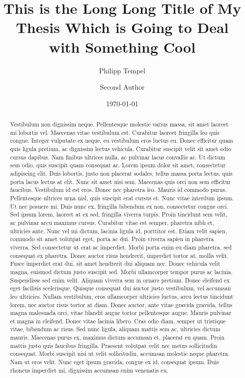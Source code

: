 \documentclass[%
  german,%
  exercise,%
  oneside,%
]{iswartcl}
\title{This is the Long Long Title of My Thesis Which is Going to Deal with Something Cool}
\author{Philipp Tempel \and Second Author}
\date{\today}
\begin{document}
\frontmatter

\maketitle


\begin{abstract}
  Vestibulum non dignissim neque. Pellentesque molestie varius massa, sit amet laoreet mi lobortis vel. Maecenas vitae vestibulum est. Curabitur laoreet fringilla leo quis congue. Integer vulputate ex neque, eu vestibulum eros luctus eu. Donec efficitur quam quis ligula pretium, ac dignissim lectus vehicula. Curabitur suscipit velit sit amet odio cursus dapibus. Nam finibus ultrices nulla, ac pulvinar lacus convallis ac. Ut dictum sem odio, quis suscipit quam consequat ac. Lorem ipsum dolor sit amet, consectetur adipiscing elit.
  Duis lobortis, justo non placerat sodales, tellus massa porta lectus, quis porta lacus lectus at elit. Nunc sit amet nisi sem. Maecenas quis orci non sem efficitur faucibus. Vestibulum id est eros. Donec nec pharetra leo. Mauris id commodo purus. Pellentesque ultrices urna nisl, quis suscipit erat cursus et. Nunc vitae interdum ipsum. Ut nec posuere mi. Duis nunc ex, fringilla bibendum ex non, consectetur congue orci. Sed ipsum lorem, laoreet at ex sed, fringilla viverra turpis. Proin tincidunt sem velit, ac pulvinar arcu maximus cursus. Curabitur vitae est semper, pharetra nibh et, ultricies ante.
  Nunc vel mi dictum, lacinia ligula id, porttitor est. Etiam velit sapien, commodo sit amet volutpat eget, porta ac dui. Proin viverra sapien in pharetra viverra. Sed consectetur ut erat ac imperdiet. Morbi porta enim eu diam pharetra, sed consequat ex pharetra. Donec auctor risus hendrerit, imperdiet tortor at, mollis velit. Fusce imperdiet erat dui, sit amet hendrerit dui aliquam nec. Donec vehicula velit magna, euismod dictum justo suscipit sed. Morbi ullamcorper tempor purus ac lacinia. Suspendisse sed enim velit. Aliquam viverra sem in ornare pretium.
  Donec eleifend ex eget facilisis scelerisque. Quisque consequat dui auctor justo vestibulum, vel accumsan leo ultricies. Nullam vestibulum, eros ullamcorper ultricies luctus, arcu lectus tincidunt lorem, nec auctor risus tortor at diam. Donec auctor, ante vitae gravida gravida, tellus magna malesuada orci, vitae blandit augue tortor pellentesque augue. Mauris pulvinar et magna in eleifend. Donec vitae lacinia libero. Cras odio diam, semper ut tristique vitae, bibendum ac risus. Sed nunc ligula, aliquam mattis sem ac, ultricies dictum mauris. Maecenas purus ex, maximus dictum accumsan et, placerat eu quam. Proin mattis justo quis faucibus fringilla. Praesent volutpat velit nec metus sollicitudin consequat. Morbi suscipit nisi ut velit sollicitudin, accumsan molestie neque pharetra. Nam ut eros velit. Nunc eget ipsum gravida, congue ex id, consequat ipsum. Duis rhoncus imperdiet mi, dignissim accumsan enim venenatis eu.
  

\end{abstract}
\end{document}
